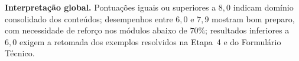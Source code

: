 \noindent\textbf{Interpretação global.} Pontuações iguais ou superiores a $8{,}0$ indicam domínio consolidado dos conteúdos; desempenhos entre $6{,}0$ e $7{,}9$ mostram bom preparo, com necessidade de reforço nos módulos abaixo de $70\%$; resultados inferiores a $6{,}0$ exigem a retomada dos exemplos resolvidos na Etapa~4 e do Formulário Técnico.
